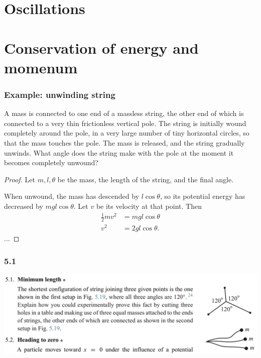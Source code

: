 \section{Oscillations}


\section{Conservation of energy and momenum}


\subsubsection{Example: unwinding string}
A mass is connected to one end of a massless string, the other end of which is connected to a very
thin frictionless vertical pole. The string is initially wound completely around the pole, in a very
large number of tiny horizontal circles, so that the mass touches the pole. The mass is released,
and the string gradually unwinds. What angle does the string make with the pole at the moment it
becomes completely unwound?

\begin{proof}
  Let $m, l, \theta$ be the mass, the length of the string, and the final angle.

  When unwound, the mass has descended by $l\cos\theta$, so its potential energy has decreased by
  $mgl\cos\theta$. Let $v$ be its velocity at that point. Then
  \begin{align*}
    \frac{1}{2}mv^2 &= mgl\cos\theta\\
    v^2             &= 2gl\cos\theta.
  \end{align*}
  ...
\end{proof}

\subsubsection*{5.1}
\begin{mdframed}
  \includegraphics[width=400pt]{img/physics--classical-mechanics--morin--5-1.png}
\end{mdframed}

